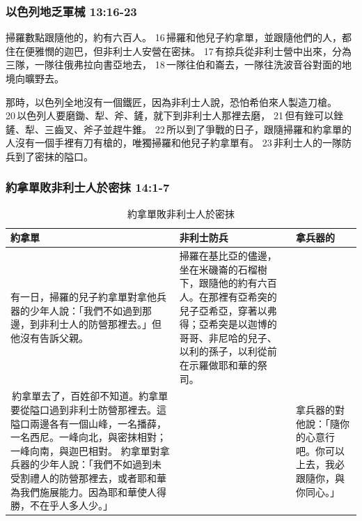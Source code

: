 \subsubsection{以色列地乏軍械 13:16-23}
掃羅數點跟隨他的，約有六百人。 16 掃羅和他兒子約拿單，並跟隨他們的人，都住在便雅憫的迦巴，但非利士人安營在密抹。 17 有掠兵從非利士營中出來，分為三隊，一隊往俄弗拉向書亞地去， 18 一隊往伯和崙去，一隊往洗波音谷對面的地境向曠野去。

那時，以色列全地沒有一個鐵匠，因為非利士人說，恐怕希伯來人製造刀槍。 20 以色列人要磨鋤、犁、斧、鏟，就下到非利士人那裡去磨， 21 但有銼可以銼鏟、犁、三齒叉、斧子並趕牛錐。 22 所以到了爭戰的日子，跟隨掃羅和約拿單的人沒有一個手裡有刀有槍的，唯獨掃羅和他兒子約拿單有。 23 非利士人的一隊防兵到了密抹的隘口。

\subsubsection{約拿單敗非利士人於密抹 14:1-7}
\begin{table}[H]
\centering 
\begin{tabular}{p{}|p{6.3cm}|p{2.3cm}}\hline\hline
約拿單&非利士防兵&拿兵器的\\\hline
有一日，掃羅的兒子約拿單對拿他兵器的少年人說：「我們不如過到那邊，到非利士人的防營那裡去。」但他沒有告訴父親。 &掃羅在基比亞的儘邊，坐在米磯崙的石榴樹下，跟隨他的約有六百人。在那裡有亞希突的兒子亞希亞，穿著以弗得；亞希突是以迦博的哥哥、非尼哈的兒子、以利的孫子，以利從前在示羅做耶和華的祭司。&\\\hline
 約拿單去了，百姓卻不知道。約拿單要從隘口過到非利士防營那裡去。這隘口兩邊各有一個山峰，一名播薛，一名西尼。一峰向北，與密抹相對；一峰向南，與迦巴相對。
約拿單對拿兵器的少年人說：「我們不如過到未受割禮人的防營那裡去，或者耶和華為我們施展能力。因為耶和華使人得勝，不在乎人多人少。」
&&拿兵器的對他說：「隨你的心意行吧。你可以上去，我必跟隨你，與你同心。」\\\hline
\end{tabular}
\caption{約拿單敗非利士人於密抹}
\end{table}

